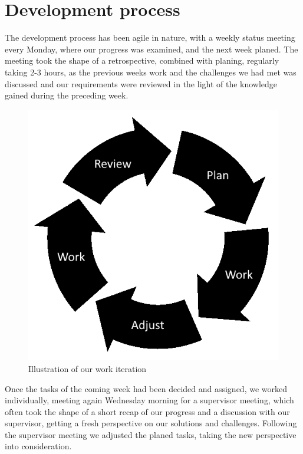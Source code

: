 \section{Development process}


The development process has been agile in nature, with a weekly status meeting every
Monday, where our progress was examined, and the next week planed. The meeting took
the shape of a retrospective, combined with planing, regularly taking 2-3 hours, as the previous weeks work and the challenges we had met was discussed and our requirements were reviewed in the light of the knowledge gained during the preceding week.

\begin{figure}[h]
\centering
\includegraphics[scale=0.5]{02-Body/Images/WorkIterations.png}
\caption{Illustration of our work iteration}
\label{fig:iterate}
\end{figure}

Once the tasks of the coming week had been decided and assigned, we worked individually, meeting again Wednesday morning for a supervisor meeting, which often took the shape of a short recap of our progress and a discussion with our supervisor, getting a fresh perspective on our solutions and challenges. Following the supervisor meeting we adjusted the planed tasks, taking the new perspective into consideration.

